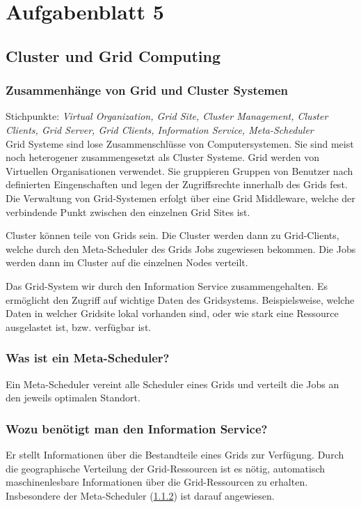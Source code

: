 \section{Aufgabenblatt 5}
\subsection{Cluster und Grid Computing}

	\subsubsection{Zusammenhänge von Grid und Cluster Systemen}
	{\scriptsize Stichpunkte: \textsl{Virtual Organization, Grid Site, Cluster Management, Cluster Clients, Grid Server, Grid Clients, Information Service, Meta-Scheduler} } \\
	
		Grid Systeme sind lose Zusammenschlüsse von Computersystemen.
		Sie sind meist noch heterogener zusammengesetzt als Cluster Systeme.
		Grid werden von Virtuellen Organisationen verwendet.
		Sie gruppieren Gruppen von Benutzer nach definierten Eingenschaften
		und legen der Zugriffsrechte innerhalb des Grids fest.
		Die Verwaltung von Grid-Systemen erfolgt über eine Grid Middleware,
		welche der verbindende Punkt zwischen den einzelnen Grid Sites ist.
		
		Cluster können teile von Grids sein.
		Die Cluster werden dann zu Grid-Clients,
		welche durch den Meta-Scheduler des Grids Jobs zugewiesen bekommen.
		Die Jobs werden dann im Cluster auf die einzelnen Nodes verteilt.
		
		Das Grid-System wir durch den Information Service zusammengehalten.
		Es ermöglicht den Zugriff auf wichtige Daten des Gridsystems.
		Beispielsweise, welche Daten in welcher Gridsite lokal vorhanden sind,
		oder wie stark eine Ressource ausgelastet ist, bzw. verfügbar ist.

	\subsubsection{Was ist ein Meta-Scheduler?}
		\label{sec:metascheduler}
		Ein Meta-Scheduler vereint alle Scheduler eines Grids und
		verteilt die Jobs an den jeweils optimalen Standort.
		
	\subsubsection{Wozu benötigt man den Information Service?}
		Er stellt Informationen über die Bestandteile eines Grids zur Verfügung.
		Durch die geographische Verteilung der Grid-Ressourcen ist es nötig,
		automatisch maschinenlesbare Informationen über die Grid-Ressourcen zu erhalten.
		Insbesondere der Meta-Scheduler (\ref{sec:metascheduler}) ist darauf angewiesen.

